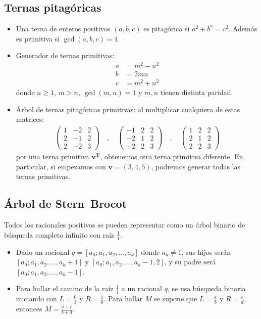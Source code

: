 \documentclass[11pt]{article}
\begin{document}
		\subsection{Ternas pitagóricas}
			\begin{itemize}
				\item Una terna de enteros positivos $(a,b,c)$ es pitagórica si $a^2+b^2=c^2$. Además es primitiva si $\gcd(a,b,c)=1$.
				\item Generador de ternas primitivas:
				\begin{align*}
					a &= m^2-n^2 \\
					b &= 2mn \\
					c &= m^2+n^2
				\end{align*}
				donde $n \geq 1$, $m>n$, $\gcd(m,n)=1$ y $m,n$ tienen distinta paridad.
				\item Árbol de ternas pitagóricas primitivas: al multiplicar cualquiera de estas matrices:
				\begin{align*}
					\begin{pmatrix}
						1 & -2 & 2 \\
						2 & -1 & 2 \\
						2 & -2 & 3
					\end{pmatrix} \quad , \quad
					\begin{pmatrix}
						-1 & 2 & 2 \\
						-2 & 1 & 2 \\
						-2 & 2 & 3
					\end{pmatrix} \quad , \quad
					\begin{pmatrix}
						1 & 2 & 2 \\
						2 & 1 & 2 \\
						2 & 2 & 3
					\end{pmatrix}
				\end{align*}
				por una terna primitiva $\mathbf{v^T}$, obtenemos otra terna primitiva diferente. En particular, si empezamos con $\mathbf{v}=(3,4,5)$, podremos generar todas las ternas primitivas.
			\end{itemize}
	
		\subsection{Árbol de Stern–Brocot}
			Todos los racionales positivos se pueden representar como un árbol binario de búsqueda completo infinito con raíz $\frac{1}{1}$.
			\begin{itemize}
				\item Dado un racional $q=[a_0;a_1,a_2,\ldots,a_k]$ donde $a_k \neq 1$, sus hijos serán $[a_0;a_1,a_2,\ldots,a_k+1]$ y $[a_0;a_1,a_2,\ldots,a_k-1,2]$, y su padre será $[a_0;a_1,a_2,\ldots,a_k-1]$.
				\item Para hallar el camino de la raíz $\frac{1}{1}$ a un racional $q$, se usa búsqueda binaria iniciando con $L=\frac{0}{1}$ y $R=\frac{1}{0}$. Para hallar $M$ se supone que $L=\frac{a}{b}$ y $R=\frac{c}{d}$, entonces $M=\frac{a+c}{b+d}$.
			\end{itemize}
	
\end{document}
